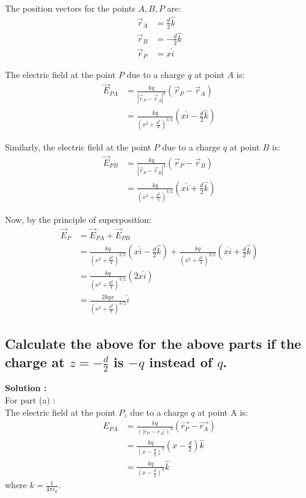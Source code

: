 \documentclass[a4paper,12pt]{article}
\begin{document}
The position vectors for the points \( A, B, P \) are:
\begin{align}
    \vec{r}_{A} &= \frac{d}{2} \hat{k} \\
    \vec{r}_{B} &= -\frac{d}{2} \hat{k} \\
    \vec{r}_{P} &= x \hat{i}
\end{align}

The electric field at the point \( P \) due to a charge \( q \) at point \( A \) is:
\begin{align}
    \vec{E}_{PA} &= \frac{kq}{|\vec{r}_P - \vec{r}_A|^3} (\vec{r}_P - \vec{r}_A) \\
    &= \frac{kq}{(x^2 + \frac{d^2}{4})^{3/2}} \left( x \hat{i} - \frac{d}{2} \hat{k} \right)
\end{align}

Similarly, the electric field at the point \( P \) due to a charge \( q \) at point \( B \) is:
\begin{align}
    \vec{E}_{PB} &= \frac{kq}{|\vec{r}_P - \vec{r}_B|^3} (\vec{r}_P - \vec{r}_B) \\
    &= \frac{kq}{(x^2 + \frac{d^2}{4})^{3/2}} \left( x \hat{i} + \frac{d}{2} \hat{k} \right)
\end{align}

Now, by the principle of superposition:
\begin{align}
    \vec{E}_P &= \vec{E}_{PA} + \vec{E}_{PB} \\
    &= \frac{kq}{(x^2 + \frac{d^2}{4})^{3/2}} \left( x \hat{i} - \frac{d}{2} \hat{k} \right) + \frac{kq}{(x^2 + \frac{d^2}{4})^{3/2}} \left( x \hat{i} + \frac{d}{2} \hat{k} \right) \\
    &= \frac{kq}{(x^2 + \frac{d^2}{4})^{3/2}} \left( 2x \hat{i} \right) \\
	&= \boxed{\frac{2kqx}{(x^2 + \frac{d^2}{4})^{3/2}} \hat{i}}
\end{align}

\subsection{Calculate the above for the above parts if the charge at $z = -\frac{d}{2}$ is $-q$ instead of $q$.}
\textbf{Solution :} \\ For part (a) : \\
The electric field at the point $P_z$ due to a charge $q$ at point A is:
\begin{align}
    E_{PA} &= \frac{kq}{(|r_P - r_A|)^3} (\vec{r_P} - \vec{r_A}) \\
    &= \frac{kq}{(x - \frac{d}{2})^3} (x - \frac{d}{2}) \hat{k} \\
    &= \frac{kq}{(x - \frac{d}{2})^2} \hat{k}
\end{align}
where $k = \frac{1}{4\pi{{\epsilon}_0}}$. \\
\end{document}
